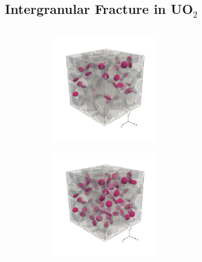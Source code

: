 \subsection{Intergranular Fracture in \texorpdfstring{UO$_2$}{UO2}}

\subsectioncover

\begin{frame}{}
\vspace{-1.5em}
\begin{columns}
    \begin{column}{0.3\textwidth}
        \begin{figure}[htb!]
            \centering
            \begin{subfigure}{\textwidth}
                \centering
                \includegraphics[width=0.5\textwidth]{past/figures/b50_ini_new.png}
            \end{subfigure}

            \begin{subfigure}{\textwidth}
                \centering
                \includegraphics[width=0.5\textwidth]{past/figures/b100_ini_new.png}
            \end{subfigure}


\end{figure}
\end{column}
\end{columns}
\end{frame}
